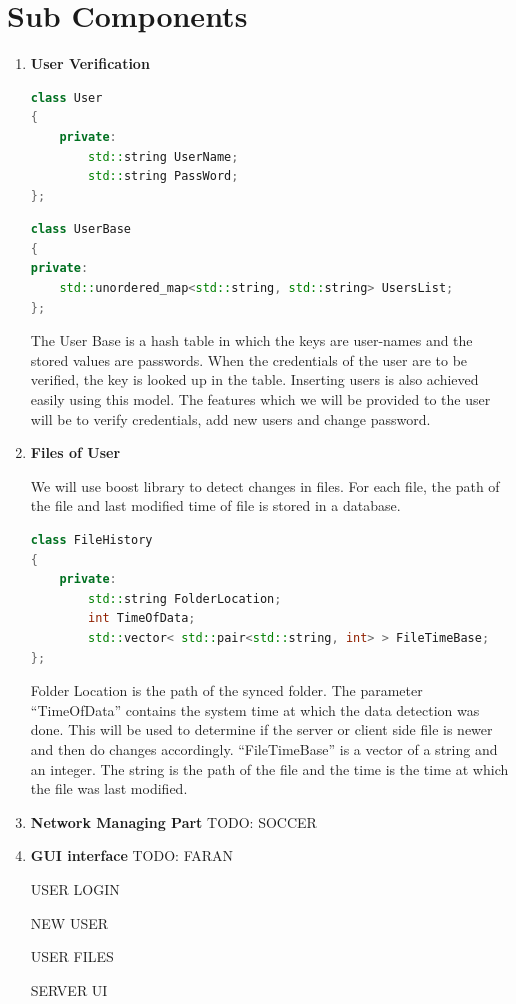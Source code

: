 \documentclass{article}
\begin{document}
	\section{Sub Components}
		\begin{enumerate}

			\item \textbf{User Verification}
			\begin{lstlisting}[language=C++, caption={Class Parameters for User}]
class User
{
	private:
		std::string UserName;
		std::string PassWord;	
};
			\end{lstlisting}
			\begin{lstlisting}[language=C++, caption={Class Parameters for User}]
class UserBase
{
private:
	std::unordered_map<std::string, std::string> UsersList;
};
			\end{lstlisting}
			The User Base is a hash table in which the keys are user-names and the stored values are passwords. When the credentials of the user are to be verified, the key is looked up in the table. Inserting users is also achieved easily using this model. The features which we will be provided to the user will be to verify credentials, add new users and change password.
			
			\item \textbf{Files of User}

			We will use boost library to detect changes in files. For each file, the path of the file and last modified time of file is stored in a database.

			\begin{lstlisting}[language=C++, caption={Class Parameters for File History}]
class FileHistory
{
	private:
		std::string FolderLocation;
		int TimeOfData;
		std::vector< std::pair<std::string, int> > FileTimeBase;
};
			\end{lstlisting}

			Folder Location is the path of the synced folder. The parameter ``TimeOfData'' contains the system time at which the data detection was done. This will be used to determine if the server or client side file is newer and then do changes accordingly. ``FileTimeBase'' is a vector of a string and an integer. The string is the path of the file and the time is the time at which the file was last modified.
			
			\item \textbf{Network Managing Part}
				\newline
				TODO: SOCCER

			\item \textbf{GUI interface} 
				\newline
				TODO: FARAN

				USER LOGIN

				NEW USER

				USER FILES

				SERVER UI

		\end{enumerate}
\end{document}

